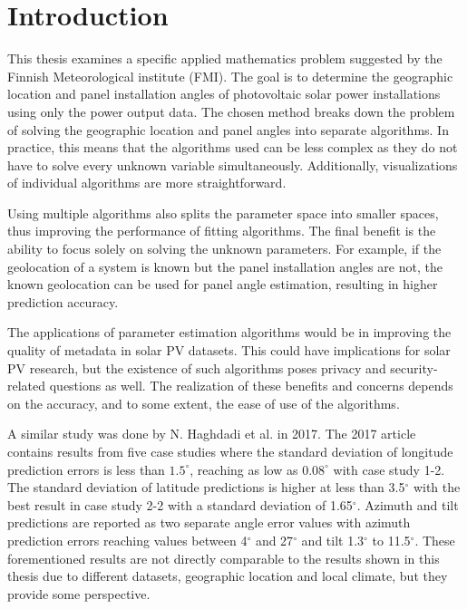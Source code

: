 \chapter{Introduction}

This thesis examines a specific applied mathematics problem suggested by the Finnish Meteorological institute (FMI). The goal is to determine the geographic location and panel installation angles of photovoltaic solar power installations using only the power output data. The chosen method breaks down the problem of solving the geographic location and panel angles into separate algorithms. In practice, this means that the algorithms used can be less complex as they do not have to solve every unknown variable simultaneously. Additionally, visualizations of individual algorithms are more straightforward. 

Using multiple algorithms also splits the parameter space into smaller spaces, thus improving the performance of fitting algorithms.  The final benefit is the ability to focus solely on solving the unknown parameters. For example, if the geolocation of a system is known but the panel installation angles are not, the known geolocation can be used for panel angle estimation, resulting in higher prediction accuracy.


The applications of parameter estimation algorithms would be in improving the quality of metadata in solar PV datasets. This could have implications for solar PV research, but the existence of such algorithms poses privacy and security-related questions as well. The realization of these benefits and concerns depends on the accuracy, and to some extent, the ease of use of the algorithms.



A similar study was done by N. Haghdadi et al. in 2017\cite{navid_australian_article}. The 2017 article contains results from five case studies where the standard deviation of longitude prediction errors is less than $1.5^\circ$, reaching as low as $0.08^\circ$ with case study 1-2. The standard deviation of latitude predictions is higher at less than 3.5$^\circ$ with the best result in case study 2-2 with a standard deviation of 1.65$^\circ$. Azimuth and tilt predictions are reported as two separate angle error values with azimuth prediction errors reaching values between 4$^\circ$ and 27$^\circ$ and tilt 1.3$^\circ$ to 11.5$^\circ$. These forementioned results are not directly comparable to the results shown in this thesis due to different datasets, geographic location and local climate, but they provide some perspective.




